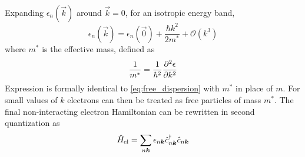 Expanding $\epsilon_n(\vec{k})$ around $\vec{k} = 0$, for an isotropic energy band,
\begin{equation} \label{eq:effective_mass}
    \epsilon_n(\vec{k}) = \epsilon_n(\vec{0}) + \frac{\hbar k^2}{2m^*} + \mathcal{O}(k^3)
\end{equation}
where $m^*$ is the effective mass, defined as
\begin{equation}
    \frac{1}{m^*} = \frac{1}{\hbar^2} \pdv[2]{\epsilon}{k}
\end{equation}
Expression  is formally identical to \cref{eq:free_dispersion} with $m^*$ in place of $m$. For small values of $k$ electrons can then be treated as free particles of mass $m^*$.
The final non-interacting electron Hamiltonian can be rewritten in second quantization as
\begin{equation}\label{eq:electron_hamiltonian}
    \hat{H}_\text{el} = \sum_{n\mathbf{\boldsymbol{k}}} \epsilon_{n\mathbf{\boldsymbol{k}}} \hat{c}^\dagger_{n\mathbf{\boldsymbol{k}}}\hat{c}_{n\mathbf{\boldsymbol{k}}}
\end{equation}

